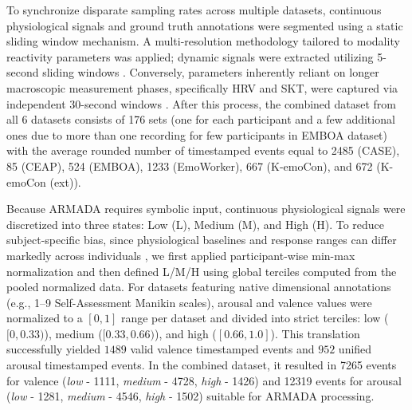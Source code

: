 \documentclass{isd}
\begin{document}
{%
To synchronize disparate sampling rates across multiple datasets, continuous physiological signals and ground truth annotations were segmented using a static sliding window mechanism. A multi-resolution methodology tailored to modality reactivity parameters was applied; dynamic signals were extracted utilizing 5-second sliding windows \cite{boucsein2012electrodermal}. Conversely, parameters inherently reliant on longer macroscopic measurement phases, specifically HRV and SKT, were captured via independent 30-second windows \cite{rossi2020error}. After this process, the combined dataset from all 6 datasets consists of 176 sets (one for each participant and a few additional ones due to more than one recording for few participants in EMBOA dataset) with the average rounded number of timestamped events equal to 2485 (CASE), 85 (CEAP), 524 (EMBOA), 1233 (EmoWorker), 667 (K-emoCon), and 672 (K-emoCon (ext)).    

Because ARMADA requires symbolic input, continuous physiological signals were discretized into three states: Low (L), Medium (M), and High (H). To reduce subject-specific bias, since physiological baselines and response ranges can differ markedly across individuals \cite{gutierrez2024personalized, braithwaite2013guide}, we first applied participant-wise min-max normalization and then defined L/M/H using global terciles computed from the pooled normalized data.
For datasets featuring native dimensional annotations (e.g., 1--9 Self-Assessment Manikin scales), arousal and valence values were normalized to a $[0, 1]$ range per dataset and divided into strict terciles: low ($[0, 0.33)$), medium ($[0.33, 0.66)$), and high ($[0.66, 1.0]$). This translation successfully yielded $1489$ valid valence timestamped events and $952$ unified arousal timestamped events. In the combined dataset, it resulted in 7265 events for valence (\textit{low} - 1111, \textit{medium} - 4728, \textit{high} - 1426) and 12319 events for arousal (\textit{low} - 1281, \textit{medium} - 4546, \textit{high} - 1502) suitable for ARMADA processing.

}
\end{document}
